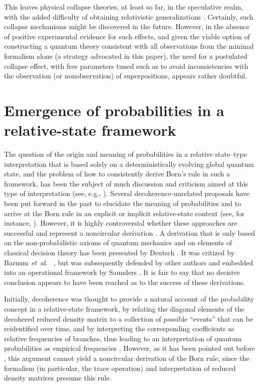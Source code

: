 \documentclass[twocolumn,aps,floatfix,amsmath,amssymb,showpacs,nofootinbib]{revtex4}
\newcommand{\etal}{\emph{et~al.\ }}
\begin{document}
This leaves physical collapse theories, at least so far, in the
speculative realm, with the added difficulty of obtaining relativistic
generalizations \cite{Bassi:2003:yb}.  Certainly, such collapse
mechanisms might be discovered in the future. However, in the absence
of positive experimental evidence for such effects, and given the
viable option of constructing a quantum theory consistent with all
observations from the minimal formalism alone (a strategy advocated in
this paper), the need for a postulated collapse effect, with free
parameters tuned such as to avoid inconsistencies with the observation
(or nonobservation) of superpositions, appears rather doubtful.


\section{Emergence of probabilities in a relative-state framework} \label{sec:prob}

The question of the origin and meaning of probabilities in a relative
state--type interpretation that is based solely on a deterministically
evolving global quantum state, and the problem of how to consistently
derive Born's rule in such a framework, has been the subject of much
discussion and criticism aimed at this type of interpretation (see,
e.g., \cite{Kent:1990:nm}). Several decoherence-unrelated
proposals have been put forward in the past to elucidate the meaning
of probabilities and to arrive at the Born rule in an explicit or
implicit relative-state context (see, for
instance, \cite{Everett:1957:rw,Hartle:1968:gg,DeWitt:1971:pz,%
  Graham:1973:ww,Geroch:1984:yt,Deutsch:1999:tz}). However, it is
highly controversial whether these approaches are successful and
represent a noncircular derivation
\cite{Stein:1984:uu,Kent:1990:nm,Squires:1990:lz}. A derivation that
is only based on the non-probabilistic axioms of quantum mechanics and
on elements of classical decision theory has been presented by Deutsch
\cite{Deutsch:1999:tz}. It was critized by Barnum \etal
\cite{Barnum:2000:oz}, but was subsequently defended by other authors
\cite{Gill:2003:tz,Wallace:2003:zr} and embedded into an operational
framework by Saunders \cite{Saunders:2002:tz}. It is fair to say that
no decisive conclusion appears to have been reached as to the success
of these derivations.

Initially, decoherence was thought to provide a natural account of the
probability concept in a relative-state framework, by relating the
diagonal elements of the decohered reduced density matrix to a
collection of possible ``events'' that can be reidentified over time,
and by interpreting the corresponding coefficients as relative
frequencies of branches, thus leading to an interpretation of quantum
probabilities as empirical frequencies
\cite{Zurek:1998:re,Deutsch:1999:tz}. However, as it has been pointed
out before \cite{Zeh:1996:gy,Zurek:2002:ii,Schlosshauer:2003:tv}, this
argument cannot yield a noncircular derivation of the Born rule, since
the formalism (in particular, the trace operation) and interpretation
of reduced density matrices presume this rule.
\end{document}
